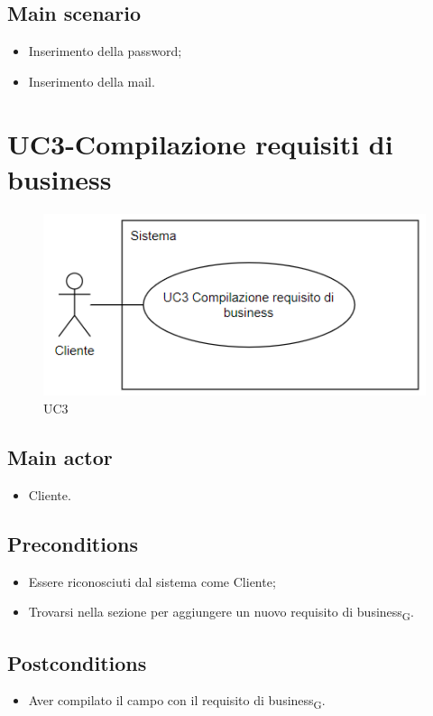 \documentclass{article}
\begin{document}
        \subsection*{Main scenario}
        \begin{itemize}
        \item Inserimento della password;
        \item Inserimento della mail.
        \end{itemize}

    
\section{UC3-Compilazione requisiti di business}
    \begin{figure}[H]
      \centering
      \includegraphics[width=.8\textwidth, height=.6\textheight, keepaspectratio]{./imgUML/UC3_compilazione.png}
            \caption{UC3}
      \label{fig:UC3}
    \end{figure}
     \subsection*{Main actor}
     \begin{itemize}
         \item Cliente.
     \end{itemize}
     \subsection*{Preconditions} 
     \begin{itemize}
         \item Essere riconosciuti dal sistema come Cliente;
         \item Trovarsi nella sezione per aggiungere un nuovo requisito di business\textsubscript{G}.
     \end{itemize}
     \subsection*{Postconditions} 
        \begin{itemize}
         \item Aver compilato il campo con il requisito di business\textsubscript{G}.
        \end{itemize}
        
\end{document}

